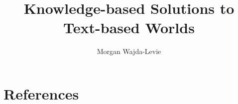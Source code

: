 \documentclass{article}
\title{Knowledge-based Solutions to Text-based Worlds}
\author{Morgan Wajda-Levie}
\begin{document}
\maketitle



















\newpage
\section*{References}
\printbibliography
\end{document}
